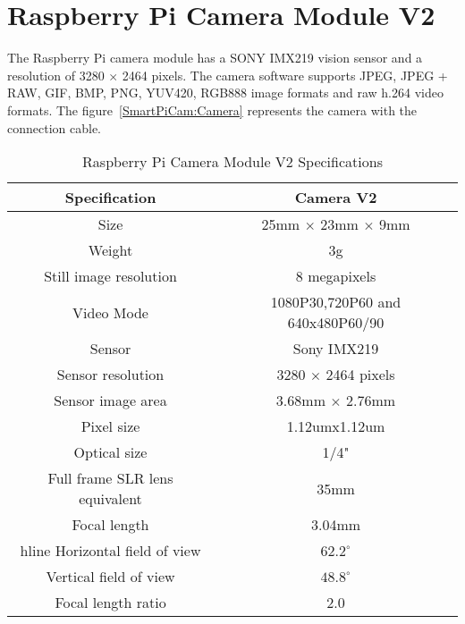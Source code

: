 %
%



\section{Raspberry Pi Camera Module V2}\label{SmartPiCAM:Kamera}

The Raspberry Pi camera module has a SONY IMX219 vision sensor and a resolution of 3280 $\times$ 2464 pixels. The camera software supports JPEG, JPEG + RAW, GIF, BMP, PNG, YUV420, RGB888 image formats and raw h.264 video formats. \cite{RaspberryPiCam:2016}
The figure~\ref{SmartPiCam:Camera} represents the camera with the connection cable.

\begin{table}[!htbp]
  \begin{center}
    \begin{tabular}{|c| c|} \hline
      Specification & Camera V2\\ \hline\hline
      Size & 25mm $\times$ 23mm $\times$ 9mm \\ \hline
      Weight & 3g\\ \hline
      Still image resolution & 8 megapixels \\ \hline
      Video Mode & 1080P30,720P60 and 640x480P60/90\\ \hline
      Sensor & Sony IMX219 \\ \hline
      Sensor resolution & 3280 $\times$ 2464 pixels \\ \hline
      Sensor image area & 3.68mm $\times$ 2.76mm \\ \hline
      Pixel size & 1.12umx1.12um\\\hline
      Optical size & 1/4"\\ \hline
      Full frame SLR lens equivalent & 35mm\\ \hline
      Focal length & 3.04mm\\hline
      Horizontal field of view & $62.2^\circ$\\ \hline
      Vertical field of view & $48.8^\circ$\\ \hline
      Focal length ratio & 2.0\\
   \end{tabular}
   \caption{Raspberry Pi Camera Module V2 Specifications \cite{RaspberryPiCam:2016}}
  
  \end{center}
\end{table}

